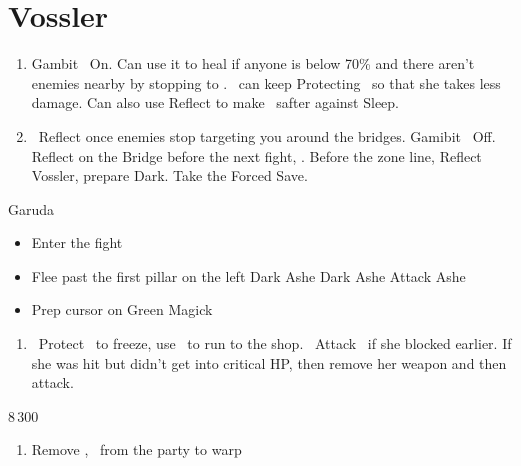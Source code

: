 \chapter{Vossler}

\begin{enumerate}
	\item Gambit \ashe\ On. Can use it to heal if anyone is below 70\% and there aren't enemies nearby by stopping to \flee. \vaan\ can keep Protecting \penelo\ so that she takes less damage. Can also use Reflect to make \penelo\ safter against Sleep.
	\item \vaan\ Reflect \vaan once enemies stop targeting you around the bridges. Gamibit \ashe\ Off. Reflect on the Bridge before the next fight, \leader{\penelo}. Before the zone line, Reflect Vossler, prepare Dark. Take the Forced Save.
\end{enumerate}
\begin{battle}{Garuda}
	\begin{itemize}
		\penelof Dark \ashe, ensure that it lands
		\ashef Attack \penelo
		\penelof If not in critical, then Attack \penelo
		\item Enter the fight
		\item Flee past the first pillar on the left
		\penelof Dark Ashe
		\vaanf Dark Ashe
		\ashef Attack Ashe
		\item Prep cursor on Green Magick
	\end{itemize}
\end{battle}
\begin{enumerate}
\item \vaan\ Protect \vaan\ to freeze, use \penelo\ to run to the shop. \ashe\ Attack \ashe\ if she blocked earlier. If she was hit but didn't get into critical HP, then remove her weapon and then attack.
\end{enumerate}
\begin{shop}{8\,300}
\end{shop}
\begin{enumerate}
	\item Remove \ashe, \penelo\ from the party to warp
\end{enumerate}
\begin{liscense}
	\begin{itemize}
	\ashef
		\begin{itemize}
		\end{itemize}
	\end{itemize}
\end{liscense}
